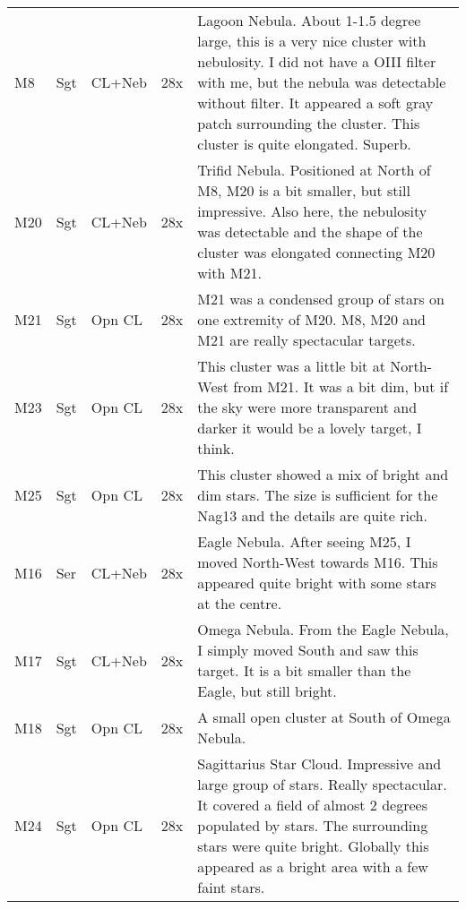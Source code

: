 \begin{longtable}{ p{0.8in}  p{0.3in}  p{0.5in}  p{0.9in}  p{5.8in} }
M8 & Sgt & CL+Neb & 28x & Lagoon Nebula. About 1-1.5 degree large, this is a very nice cluster with nebulosity. I did not have a OIII filter with me, but the nebula was detectable without filter. It appeared a soft gray patch surrounding the cluster. This cluster is quite elongated. Superb. \\ 
M20 & Sgt & CL+Neb & 28x & Trifid Nebula. Positioned at North of M8, M20 is a bit smaller, but still impressive. Also here, the nebulosity was detectable and the shape of the cluster was elongated connecting M20 with M21. \\ 
M21 & Sgt & Opn CL & 28x & M21 was a condensed group of stars on one extremity of M20. M8, M20 and M21 are really spectacular targets.   \\ 
M23 & Sgt & Opn CL & 28x & This cluster was a little bit at North-West from M21. It was a bit dim, but if the sky were more transparent and darker it would be a lovely target, I think. \\ 
M25 & Sgt & Opn CL & 28x & This cluster showed a mix of bright and dim stars. The size is sufficient for the Nag13 and the details are quite rich. \\ 
M16 & Ser & CL+Neb & 28x & Eagle Nebula. After seeing M25, I moved North-West towards M16. This appeared quite bright with some stars at the centre.  \\ 
M17 & Sgt & CL+Neb & 28x & Omega Nebula. From the Eagle Nebula, I simply moved South and saw this target. It is a bit smaller than the Eagle, but still bright.  \\ 
M18 & Sgt & Opn CL & 28x & A small open cluster at South of Omega Nebula. \\ 
M24 & Sgt & Opn CL & 28x & Sagittarius Star Cloud. Impressive and large group of stars. Really spectacular. It covered a field of almost 2 degrees populated by stars. The surrounding stars were quite bright. Globally this appeared as a bright area with a few faint stars. \\ 
\hline 
\end{longtable} 
